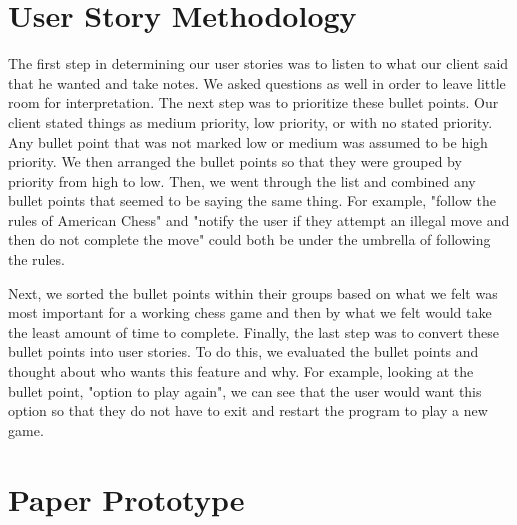 \documentclass{article}
\begin{document}
	\section{User Story Methodology}
		The first step in determining our user stories was to listen to what our client said that he wanted and take notes.  We asked questions as well in order to leave little room for interpretation.  The next step was to prioritize these bullet points.  Our client stated things as medium priority, low priority, or with no stated priority. Any bullet point that was not marked low or medium was assumed to be high priority.  We then arranged the bullet points so that they were grouped by priority from high to low.  Then, we went through the list and combined any bullet points that seemed to be saying the same thing.  For example, "follow the rules of American Chess" and "notify the user if they attempt an illegal move and then do not complete the move" could both be under the umbrella of following the rules. \par
		Next, we sorted the bullet points within their groups based on what we felt was most important for a working chess game and then by what we felt would take the least amount of time to complete.  Finally, the last step was to convert these bullet points into user stories.  To do this, we evaluated the bullet points and thought about who wants this feature and why.  For example, looking at the bullet point, "option to play again", we can see that the user would want this option so that they do not have to exit and restart the program to play a new game. 
	\newpage
	\section{Paper Prototype}
\end{document}
